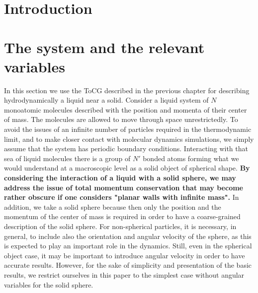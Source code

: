 \documentclass[a4paper,openright,12pt]{book}
\newcommand{\Note}[1]{{\bf \color{red}#1}}    %
\begin{document}
\section{Introduction}

\section{The system and the relevant variables}
In this section we use the ToCG described in the previous chapter for describing hydrodynamically a liquid near a solid. 
Consider a liquid system of $N$ monoatomic molecules described
with the position and momenta of  their center of mass.  The molecules
are allowed to move through  space unrestrictedly. To avoid the issues
of  an infinite  number  of particles  required  in the  thermodynamic
limit, and to make closer contact with molecular dynamics simulations,
we simply  assume that  the system  has periodic  boundary conditions.
Interacting with that sea of liquid molecules there is a group of $N'$
bonded atoms forming  what we would understand at a macroscopic level
as a solid object of spherical shape. \Note{By considering the interaction of a liquid with a solid sphere, we may address the issue of total momentum conservation that may become rather obscure if one considers "planar walls with infinite mass".}
In addition, we take a solid sphere because then only the position and the momentum of the center of mass is required in order to have a coarse-grained description of the solid sphere. For non-spherical particles, it is necessary, in general, to include also the orientation  and angular velocity of the sphere, as this is expected to play an important role in the dynamics. 
Still, even in the spherical object case, it may be important to introduce angular velocity in order to have accurate results. 
However, for the sake of simplicity and presentation of the basic results, we restrict ourselves in this paper to the simplest case without angular variables for the solid sphere.  
\end{document}
